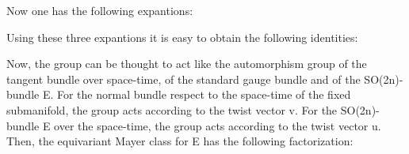 \documentclass[a4paper,a4paper]{article}
\begin{document}
Now one has the following expantions:
\begin{center}
\setlength{\baselineskip}{30pt} 
{  \coordHE{} }
\end{center}
\begin{center}
\setlength{\baselineskip}{30pt} 
{  \coordHE{} }
\end{center}
Using these three expantions it is easy to obtain the following identities:

\begin{center}
 
{  \coordHE{}}
\end{center} 
\begin{center}
 
{  \coordHE{}}
\end{center} 
\begin{center}
 
{  \coordHE{}}
\end{center}
\begin{center}
{  \coordHE{}}
\end{center} 
\begin{center}
 
{  \coordHE{}}
\end{center}

Now, the group \coordHE{} can be thought to act like the automorphism group of the tangent bundle over space-time, of the standard gauge bundle and of the
SO(2n)-bundle E. For the normal bundle respect to the space-time of the fixed submanifold, the group \coordHE{} acts according to the twist vector v. For the SO(2n)-bundle E over the space-time,  the group \coordHE{} acts according to the twist vector u. Then, the equivariant Mayer class for E has the following factorization:

\begin{center}
{  \coordHE{} }
\end{center}
\end{document}
